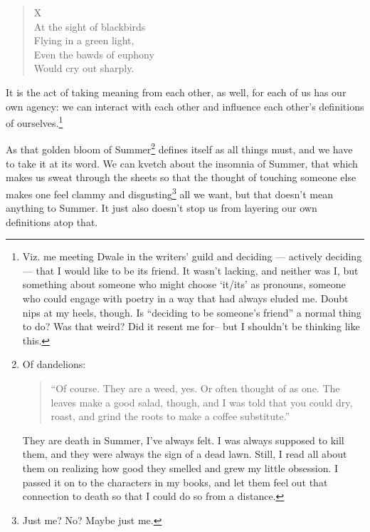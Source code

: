 \begin{verse}
X \\
At the sight of blackbirds \\
Flying in a green light, \\
Even the bawds of euphony \\
Would cry out sharply.

\parencite{blackbird}
\end{verse}

It is the act of taking meaning from each other, as well, for each of us has our own agency: we can interact with each other and influence each other's definitions of ourselves.\footnote{Viz. me meeting Dwale in the writers' guild and deciding --- actively deciding --- that I would like to be its friend. It wasn't lacking, and neither was I, but something about someone who might choose `it/its' as pronouns, someone who could engage with poetry in a way that had always eluded me. Doubt nips at my heels, though. Is ``deciding to be someone's friend'' a normal thing to do? Was that weird? Did it resent me for-- but I shouldn't be thinking like this.}

As that golden bloom of Summer\footnote{Of dandelions:\begin{quote}``Of course. They are a weed, yes. Or often thought of as one. The leaves make a good salad, though, and I was told that you could dry, roast, and grind the roots to make a coffee substitute.''\par
\parencite[161]{toledot}\end{quote}\par
They are death in Summer, I've always felt. I was always supposed to kill them, and they were always the sign of a dead lawn. Still, I read all about them on realizing how good they smelled and grew my little obsession. I passed it on to the characters in my books, and let them feel out that connection to death so that I could do so from a distance.} defines itself as all things must, and we have to take it at its word. We can kvetch about the insomnia of Summer, that which makes us sweat through the sheets so that the thought of touching someone else makes one feel clammy and disgusting\footnote{Just me? No? Maybe just me.} all we want, but that doesn't mean anything to Summer. It just also doesn't stop us from layering our own definitions atop that.
